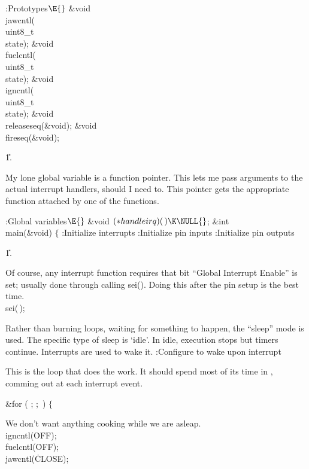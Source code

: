 \B{}:Prototypes\X${}\E{}$\6
\&{void} \\{jawcntl}(\\{uint8\_t}\\{state});\6
\&{void} \\{fuelcntl}(\\{uint8\_t}\\{state});\6
\&{void} \\{igncntl}(\\{uint8\_t}\\{state});\6
\&{void} \\{releaseseq}(\&{void});\6
\&{void} \\{fireseq}(\&{void});\par
\U1.\fi

My lone global variable is a function pointer.
This lets me pass arguments to the actual interrupt handlers, should I need to.
This pointer gets the appropriate function attached by one of the 
functions.

\Y\B\4:Global variables\X${}\E{}$\6
\&{void} ${}({*}\\{handleirq})(\,)\K\NULL{}$;\6
\&{int} \\{main}(\&{void})\1\1\6
$\{{}$\6
:Initialize interrupts\X\6
:Initialize pin inputs\X\6
:Initialize pin outputs\X\par
\U1.\fi

Of course, any interrupt function requires that bit ``Global Interrupt Enable''
is set; usually done through calling sei(). Doing this after the pin setup is
the best time.
\Y\B\\{sei}(\,);\par
\fi

Rather than burning loops, waiting for something to happen,
the ``sleep'' mode is used.
The specific type of sleep is `idle'.
In idle, execution stops but timers continue.
Interrupts are used to wake it.
\Y\B{}:Configure to wake upon interrupt\X\par
\fi

This is the loop that does the work.
It should spend most of its time in ,
comming out at each interrupt event.

\Y\B\&{for} ( ;  ; \,)\6
$\{{}$\par
\fi

We don't want anything cooking while we are asleap.
\Y\B\\{igncntl}(\.{OFF});\6
\\{fuelcntl}(\.{OFF});\6
\\{jawcntl}(\.{CLOSE});\par
\fi

